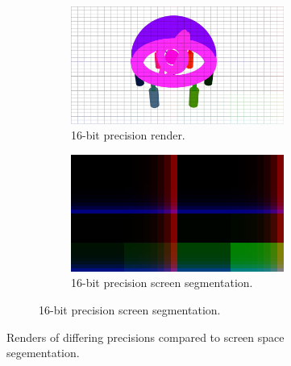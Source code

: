 \documentclass[conference]{IEEEtran}
\begin{document}
\begin{figure}[htbp]
\begin{subfigure}{1.1\textwidth}
\end{subfigure}
\par\medskip
\begin{subfigure}{1.1\textwidth}
\begin{center}
\begin{minipage}[t]{\linewidth}
\hspace{-0.09\linewidth}
  \centering
    \begin{subfigure}{.49\textwidth}
      \centering
      \includegraphics[width=\linewidth]{16_render_cropped.jpg}
      \caption{16-bit precision render.}
      \label{fig:render_8}
    \end{subfigure}
    \begin{subfigure}{.49\textwidth}
      \centering
      \includegraphics[width=\linewidth]{16_partition_cropped.jpg}
      \caption{16-bit precision screen segmentation.}
      \label{fig:render_8}
    \end{subfigure}
  \label{fig:render_16}
\end{minipage}
\end{center}
\end{subfigure}
\caption{Renders of differing precisions compared to screen space segementation.}
\label{fig:render_comparisons}
\end{figure}
\end{document}
